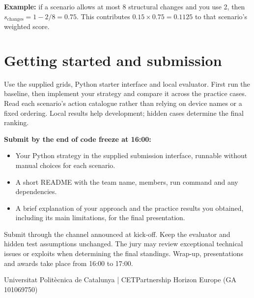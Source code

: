 \documentclass[10pt,a4paper]{article}
\begin{document}
\textbf{Example:} if a scenario allows at most 8 structural changes and you use 2,
then $s_{\mathrm{changes}}=1-2/8=0.75$. This contributes $0.15\times0.75=0.1125$
to that scenario's weighted score.

\section{Getting started and submission}
Use the supplied grids, Python starter interface and local evaluator. First run
the baseline, then implement your strategy and compare it across the practice
cases. Read each scenario's action catalogue rather than relying on device names
or a fixed ordering. Local results help development; hidden cases determine the
final ranking.

\textbf{Submit by the end of code freeze at 16:00:}
\begin{itemize}
  \item Your Python strategy in the supplied submission interface, runnable without
        manual choices for each scenario.
  \item A short README with the team name, members, run command and any dependencies.
  \item A brief explanation of your approach and the practice results you obtained,
        including its main limitations, for the final presentation.
\end{itemize}
Submit through the channel announced at kick-off. Keep the evaluator and hidden
test assumptions unchanged. The jury may review exceptional technical issues or
exploits when determining the final standings. Wrap-up, presentations and awards
take place from 16:00 to 17:00.

\vfill
{\footnotesize\color{tggraphit}%
Universitat Polit\`ecnica de Catalunya | CETPartnership Horizon Europe (GA 101069750)}
\end{document}
